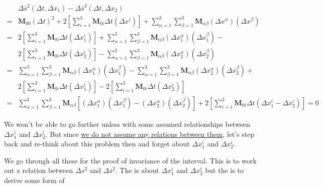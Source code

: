 \begin{tcolorbox}
    \begin{align}
        &\Delta\bar{s}^2(\Delta t, \Delta x_1) - \Delta\bar{s}^2(\Delta t, \Delta x_2) \\
        ={}& \boldsymbol{M}_{00}\left( \Delta t \right)^2 + 2\left[ \sum_{i = 1}^3\boldsymbol{M}_{0i}\Delta t \left(\Delta x^i\right) \right] + \sum_{\alpha = 1}^3\sum_{\beta = 1}^3 \boldsymbol{M}_{\alpha\beta}\left(\Delta x^{\alpha}\right)\left(\Delta x^{\beta}\right) \\
        ={}& 2\left[ \sum_{i = 1}^3\boldsymbol{M}_{0i}\Delta t \left(\Delta x_1^i\right) \right] + \sum_{\alpha = 1}^3\sum_{\beta = 1}^3 \boldsymbol{M}_{\alpha\beta}\left(\Delta x_1^{\alpha}\right)\left(\Delta x_1^{\beta}\right) - \nonumber\\
        & 2\left[ \sum_{i = 1}^3\boldsymbol{M}_{0i}\Delta t \left(\Delta x_2^i\right) \right] - \sum_{\alpha = 1}^3\sum_{\beta = 1}^3 \boldsymbol{M}_{\alpha\beta}\left(\Delta x_2^{\alpha}\right)\left(\Delta x_2^{\beta}\right) \\
        ={}& \sum_{\alpha = 1}^3\sum_{\beta = 1}^3 \boldsymbol{M}_{\alpha\beta}\left(\Delta x_1^{\alpha}\right)\left(\Delta x_1^{\beta}\right) - \sum_{\alpha = 1}^3\sum_{\beta = 1}^3 \boldsymbol{M}_{\alpha\beta}\left(\Delta x_2^{\alpha}\right)\left(\Delta x_2^{\beta}\right) + \nonumber\\
        & 2\left[ \sum_{i = 1}^3\boldsymbol{M}_{0i}\Delta t \left(\Delta x_1^i\right) \right] - 2\left[ \sum_{i = 1}^3\boldsymbol{M}_{0i}\Delta t \left(\Delta x_2^i\right) \right] \\
        ={}& \sum_{\alpha = 1}^3\sum_{\beta = 1}^3 \boldsymbol{M}_{\alpha\beta} \left[ \left(\Delta x_1^{\alpha}\right)\left(\Delta x_1^{\beta}\right) - \left(\Delta x_2^{\alpha}\right)\left(\Delta x_2^{\beta}\right) \right] + 2\left[ \sum_{i = 1}^3\boldsymbol{M}_{0i}\Delta t \left(\Delta x_1^i - \Delta x_2^i\right) \right] = 0 \label{eq:details}
    \end{align}

    We won't be able to go further unless with some assumed relationships between $\Delta x_1^i$ and $\Delta x_2^i$.
    But since \hyperlink{wrong-postulate}{we do not assume any relations between them}, let's step back and re-think about this problem then and forget about $\Delta x_1^i$ and $\Delta x_2^i$.

    We go through all these for the proof of invariance of the interval. This is to work out a relation between $\Delta s^2$ and $\Delta \bar{s}^2$. The  is about $\Delta x_1^i$ and $\Delta x_2^i$ but the  is to derive some form of


\end{tcolorbox}
